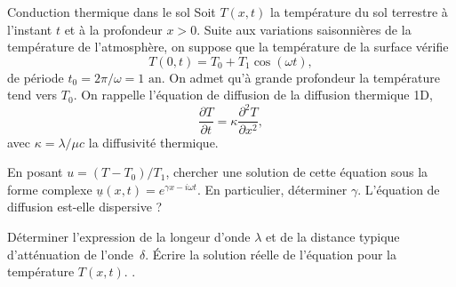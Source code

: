 \begin{exo}[PSI][2][TD]{Conduction thermique dans le sol}
Soit $T(x,t)$ la température du sol terrestre à l'instant $t$ et à la profondeur $x>0$. Suite aux variations saisonnières de la température de l'atmosphère, on suppose que la température de la surface vérifie
\begin{equation}
T(0,t) = T_0 + T_1 \cos(\omega t),
\end{equation}
de période $t_0 = 2\pi/\omega =1\text{ an}$.
On admet qu'à grande profondeur la température tend vers $T_0$. On rappelle l'équation de diffusion de la diffusion thermique 1D,
\begin{equation}\label{eq:diffu}
\dfrac{\partial T}{\partial t} = \kappa \dfrac{\partial^2 T}{\partial x^2},
\end{equation}
avec $\kappa = \lambda/\mu c$ la diffusivité thermique.


\begin{quest}

\item En posant $u=(T-T_0)/T_1$, chercher une solution de cette équation sous la forme complexe $\underline{u}(x,t)=e^{\gamma x-i\omega t}$. En particulier, déterminer $\gamma$. L'équation de diffusion est-elle dispersive ?


\item Déterminer l'expression de la longeur d'onde $\lambda$ et de la distance typique d'atténuation de l'onde~$\delta$. Écrire la solution réelle de l'équation pour la température $T(x,t)$.  \AN.



\end{quest}
\end{exo}
